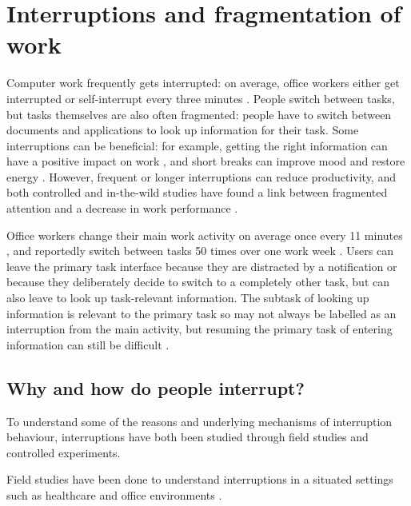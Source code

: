 \section{Interruptions and fragmentation of work}
Computer work frequently gets interrupted: on average, office workers either get interrupted or self-interrupt every three minutes \citep{Gonzalez2004}. People switch between tasks, but tasks themselves are also often fragmented: people have to switch between documents and applications to look up information for their task. Some interruptions can be beneficial: for example, getting the right information can have a positive impact on work \citep{Jin2009}, and short breaks can improve mood and restore energy \citep{Mark2014a}. However, frequent or longer interruptions can reduce productivity, and both controlled and in-the-wild studies have found a link between fragmented attention and a decrease in work performance \citep{Bailey2001, Carrier2015}. 

Office workers change their main work activity on average once every 11 minutes \citep{Mark2005}, and reportedly switch between tasks 50 times over one work week \citep{Czerwinski2004}.  Users can leave the primary task interface because they are distracted by a notification or because they deliberately decide to switch to a completely other task, but can also leave to look up task-relevant information. The subtask of looking up information is relevant to the primary task so may not always be labelled as an interruption from the main activity, but resuming the primary task of entering information can still be difficult \citep{Rule2013}.

\subsection{Why and how do people interrupt?}
To understand some of the reasons and underlying mechanisms of interruption behaviour, interruptions have both been studied through field studies and controlled experiments.

Field studies have been done to understand interruptions in a situated settings such as healthcare \citep{Grundgeiger2010} and office environments \citep[e.g.][]{Czerwinski2004, Gonzalez2004}. 

